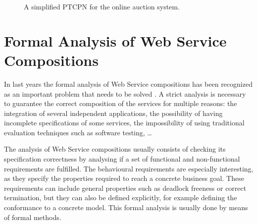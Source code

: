 \begin{figure}[!ht]
\begin{center}
\end{center}
\vspace{-0.6cm}
\caption{\label{casestudy} A simplified PTCPN for the online auction system.}
\end{figure}

\section{Formal Analysis of Web Service Compositions}\label{AnalysisWSC}

In last years the formal analysis of Web Service compositions has been recognized as an important problem that needs to be solved \cite{Carbone2006,Dong2006,Foster2007,Yang2008}. A strict analysis is necessary to guarantee the correct composition of the services for multiple reasons: the integration of several independent applications, the possibility of having incomplete specifications of some services, the impossibility of using traditional evaluation techniques such as software testing, \ldots

The analysis of Web Service compositions usually consists of checking its specification correctness by analysing if a set of functional and non-functional requirements are fulfilled. The behavioural requirements are especially interesting, as they specify the properties required to reach a concrete business goal. These requirements can include general properties such as deadlock freeness or correct termination, but they can also be defined explicitly, for example defining the conformance to a concrete model. This formal analysis is usually done by means of formal methods.

